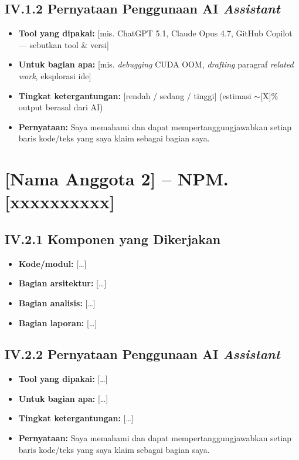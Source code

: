 \documentclass[11pt,a4paper,oneside]{report}
\begin{document}
\subsection*{IV.1.2 Pernyataan Penggunaan AI \textit{Assistant}}
\begin{itemize}[leftmargin=*]
    \item \textbf{Tool yang dipakai:} [mis. ChatGPT 5.1, Claude Opus 4.7, GitHub Copilot --- sebutkan tool \& versi]
    \item \textbf{Untuk bagian apa:} [mis. \textit{debugging} CUDA OOM, \textit{drafting} paragraf \textit{related work}, eksplorasi ide]
    \item \textbf{Tingkat ketergantungan:} [rendah / sedang / tinggi] (estimasi $\sim$[X]\% output berasal dari AI)
    \item \textbf{Pernyataan:} Saya memahami dan dapat mempertanggungjawabkan setiap baris kode/teks yang saya klaim sebagai bagian saya.
\end{itemize}

\section{[Nama Anggota 2] -- NPM. [xxxxxxxxxx]}

\subsection*{IV.2.1 Komponen yang Dikerjakan}
\begin{itemize}[leftmargin=*]
    \item \textbf{Kode/modul:} [\ldots]
    \item \textbf{Bagian arsitektur:} [\ldots]
    \item \textbf{Bagian analisis:} [\ldots]
    \item \textbf{Bagian laporan:} [\ldots]
\end{itemize}

\subsection*{IV.2.2 Pernyataan Penggunaan AI \textit{Assistant}}
\begin{itemize}[leftmargin=*]
    \item \textbf{Tool yang dipakai:} [\ldots]
    \item \textbf{Untuk bagian apa:} [\ldots]
    \item \textbf{Tingkat ketergantungan:} [\ldots]
    \item \textbf{Pernyataan:} Saya memahami dan dapat mempertanggungjawabkan setiap baris kode/teks yang saya klaim sebagai bagian saya.
\end{itemize}
\end{document}
